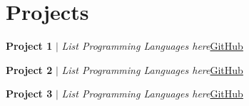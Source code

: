 \section{Projects}


  \resumeSubHeadingListStart
    \resumeProjectHeading
    {\textbf{Project 1} $|$ \emph{List Programming Languages here}}{\href{https://github.com/username/repo-name}{\color{blue}}\underline{GitHub}}
      \resumeItemListStart
      \resumeItemListEnd

    \resumeProjectHeading
    {\textbf{Project 2} $|$ \emph{List Programming Languages here}{\href{https://github.com/username/repo-name}{\color{blue}}\underline{GitHub}}}
      \resumeItemListStart
      \resumeItemListEnd

    \resumeProjectHeading
    {\textbf{Project 3} $|$ \emph{List Programming Languages here}}{\href{https://github.com/username/repo-name}{\color{blue}}\underline{GitHub}}
      \resumeItemListStart
      \resumeItemListEnd

  \resumeSubHeadingListEnd

